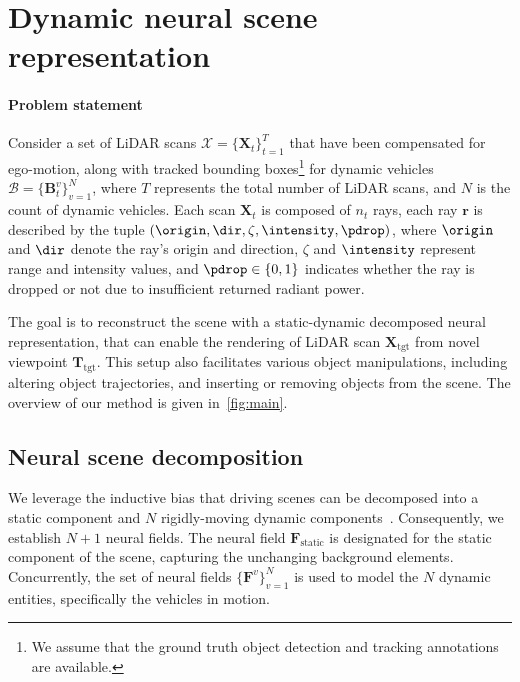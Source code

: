 \section{Dynamic neural scene representation}

\paragraph{Problem statement} 
Consider a set of LiDAR scans $\mathcal{X} = \{\mathbf{X}_t\}_{t=1}^T$ that have been compensated for ego-motion, along with tracked bounding boxes\footnote{We assume that the ground truth object detection and tracking annotations are available.} for dynamic vehicles $\mathcal{B} = \{\mathbf{B}_t^v\}_{v=1}^{N}$, where $T$ represents the total number of LiDAR scans, and $N$ is the count of dynamic vehicles. Each scan $\mathbf{X}_t$ is composed of $n_t$ rays, each ray $\mathbf{r}$ is described by the tuple $(\origin, \dir, \zeta, \intensity, \pdrop)$, where $\origin$ and $\dir$ denote the ray's origin and direction, $\zeta$ and $\intensity$ represent range and intensity values, and $\pdrop \in \{0,1\}$ indicates whether the ray is dropped or not due to insufficient returned radiant power.


The goal is to reconstruct the scene with a static-dynamic decomposed neural representation, that can enable the rendering of LiDAR scan $\mathbf{X}_{\text{tgt}}$ from novel viewpoint $\mathbf{T}_{\text{tgt}}$. This setup also facilitates various object manipulations, including altering object trajectories, and inserting or removing objects from the scene. The overview of our method is given in~\cref{fig:main}.

\subsection{Neural scene decomposition} \label{sec: decomposition}
We leverage the inductive bias that driving scenes can be decomposed into a static component and $N$ rigidly-moving dynamic components~\cite{huang2022dynamic,gojcic2021weakly}. Consequently, we establish $N+1$ neural fields. The neural field $\mathbf{F}_{\text{static}}$ is designated for the static component of the scene, capturing the unchanging background elements. Concurrently, the set of neural fields $\{\mathbf{F}^v\}_{v=1}^{N}$ is used to model the $N$ dynamic entities, specifically the vehicles in motion.



